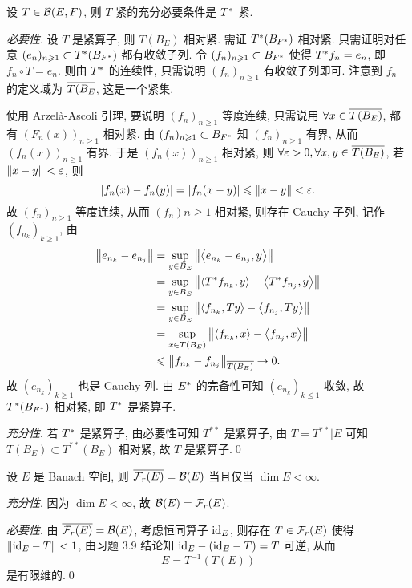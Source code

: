 	\begin{Theorem}
		设 $ T\in\CB(E, F) $, 则 $ T $ 紧的充分必要条件是 $ \Star{T} $ 紧.
	\end{Theorem}
	\begin{Proof}
		\textsl{必要性}. 设 $ T $ 是紧算子, 则 $ T(B_{E}) $ 相对紧. 需证 $ \Star{T}(B_{\Star{F}}) $ 相对紧. 只需证明对任意 $ (e_{n})_{n\geqslant1}\subset \Star{T}(B_{\Star{F}}) $ 都有收敛子列. 令 $ (f_{n})_{n\geqslant1}\subset B_{\Star{F}} $ 使得 $ \Star{T}f_{n}=e_{n} $, 即 $ f_{n}\circ T=e_{n} $. 则由 $ \Star{T} $ 的连续性, 只需说明 $ (f_{n})_{n\geqslant1} $ 有收敛子列即可. 注意到 $ f_{n} $ 的定义域为 $ \baro{T(B_{E}} $, 这是一个紧集.

		使用 Arzel\`a-Ascoli 引理, 要说明 $ (f_{n})_{n\geqslant1} $ 等度连续, 只需说用 $ \forall x\in\baro{T(B_{E})} $, 都有 $ (F_{n}(x))_{n\geqslant1} $ 相对紧. 由 $ (f_{n})_{n\geqslant1}\subset B_{\Star{F}} $ 知 $ (f_{n})_{n\geqslant1} $ 有界, 从而 $ (f_{n}(x))_{n\geqslant1} $ 有界. 于是 $ (f_{n}(x))_{n\geqslant1} $ 相对紧, 则 $ \forall\varepsilon>0, \forall x, y\in\baro{T(B_{E})} $, 若 $ \norm{x-y}<\varepsilon $, 则
		\[
			\abs{f_{n}(x)-f_{n}(y)} = \abs{f_{n}(x-y)}\leqslant\norm{x-y}<\varepsilon.
		\] 
		故 $ (f_{n})_{n\geqslant1} $ 等度连续, 从而 $ (f_{n}){n\geqslant1} $ 相对紧, 则存在 Cauchy 子列,
		记作 $ (f_{n_{k}})_{k\geqslant1} $, 由
		\[
			\begin{aligned}
				\norm{e_{n_{k}}-e_{n_{j}}} & = \sup_{y\in B_{E}}\norm{\lrangle{e_{n_{k}}-e_{n_{j}}, y}} \\
				& = \sup_{y\in B_{E}}\norm{\lrangle{\Star{T}f_{n_{k}}, y}-\lrangle{\Star{T}f_{n_{j}}, y}}\\
				& = \sup_{y\in B_{E}}\norm{\lrangle{f_{n_{k}}, Ty}-\lrangle{f_{n_{j}}, Ty}}\\
				& =  \sup_{x\in T(B_{E})}\norm{\lrangle{f_{n_{k}}, x}-\lrangle{f_{n_{j}}, x}}\\
				& \leqslant \norm{f_{n_{k}}-f_{n_{j}}}_{\baro{T(B_{E})}}\to 0.
			\end{aligned}
		\]
		故 $ (e_{n_{k}})_{k\geqslant1} $ 也是 Cauchy 列. 由 $ \Star{E} $ 的完备性可知 $ (e_{n_{k}})_{k\leqslant1} $ 收敛, 故 $ \Star{T}(B_{\Star{F}}) $ 相对紧, 即 $ \Star{T} $ 是紧算子.

		\textsl{充分性}. 若 $ \Star{T} $ 是紧算子, 由必要性可知 $ T^{**} $ 是紧算子, 由 $ T = T^{**}|E $ 可知 $ T(B_{E})\subset T^{**}(B_{E}) $ 相对紧, 故 $ T $ 是紧算子.\qed
	\end{Proof}

	\begin{Proposition}
		设 $ E $ 是 Banach 空间, 则 $ \baro{\Fr(E)}=\CB(E) $ 当且仅当 $ \dim E<\infty $.
	\end{Proposition}
	\begin{Proof}
		\textsl{充分性}. 因为 $ \dim E<\infty $, 故 $ \CB(E)=\Fr(E) $.

		\textsl{必要性}. 由 $ \baro{\Fr(E)}=\CB(E) $, 考虑恒同算子 $ \id_{E} $, 则存在 $ T\in\Fr(E) $ 使得 $ \norm{\id_{E}-T}<1 $, 由习题 3.9 结论知 $ \id_{E}-(\id_{E}-T)=T $ 可逆, 从而
		\[
			E = T^{-1}(T(E))
		\]
		是有限维的.\qed
	\end{Proof}


